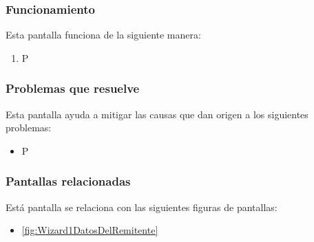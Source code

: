 \subsubsection{Funcionamiento}
	Esta pantalla funciona de la siguiente manera:
	
	\begin{enumerate}
		\item P
	\end{enumerate}

\subsubsection{Problemas que resuelve}
Esta pantalla ayuda a mitigar las causas que dan origen a los siguientes problemas:

	\begin{itemize}
		\item P
	\end{itemize}

\subsubsection{Pantallas relacionadas}
Está pantalla se relaciona con las siguientes figuras de pantallas:
	\begin{itemize}
		\item \ref{fig:Wizard1DatosDelRemitente}
	\end{itemize}